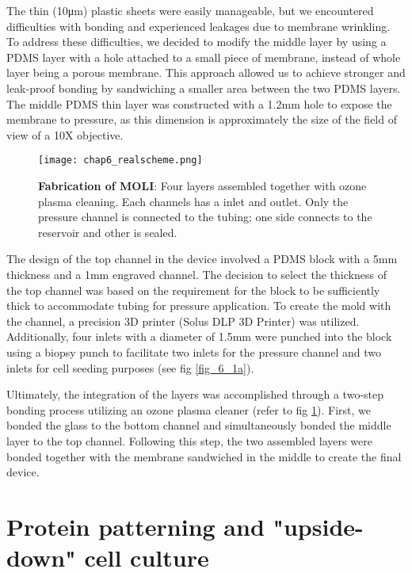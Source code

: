 The thin (10\unit{\um}) plastic sheets were easily manageable, but we encountered difficulties with bonding and experienced leakages due to membrane wrinkling. To address these difficulties, we decided to modify the middle layer by using a PDMS layer with a hole attached to a small piece of membrane, instead of whole layer being a porous membrane. This approach allowed us to achieve stronger and leak-proof bonding by sandwiching a smaller area between the two PDMS layers. The middle PDMS thin layer was constructed with a 1.2\unit{\mm} hole to expose the membrane to pressure, as this dimension is approximately the size of the field of view of a 10X objective.

\begin{figure}[b!]
	\centering
	\texttt{[image: chap6\_realscheme.png]}
	\caption{ \textbf{Fabrication of MOLI}: Four layers assembled together with ozone plasma cleaning. Each channels has a inlet and outlet. Only the pressure channel is connected to the tubing; one side connects to the reservoir and other is sealed. 
	}\label{fig_6_2}
\end{figure}

The design of the top channel in the device involved a PDMS block with a 5\unit{\mm} thickness and a 1mm engraved channel. The decision to select the thickness of the top channel was based on the requirement for the block to be sufficiently thick to accommodate tubing for pressure application.  To create the mold with the channel, a precision 3D printer (Solus DLP 3D Printer) was utilized. Additionally, four inlets with a diameter of 1.5\unit{\mm} were punched into the block using a biopsy punch to facilitate two inlets for the pressure channel and two inlets for cell seeding purposes  (see fig \ref{fig_6_1a}).

Ultimately, the integration of the layers was accomplished through a two-step bonding process utilizing an ozone plasma cleaner (refer to fig \ref{fig_6_2}). First, we bonded the glass to the bottom channel and simultaneously bonded the middle layer to the top channel. Following this step, the two assembled layers were bonded together with the membrane sandwiched in the middle to create the final device.
\vspace{-0.05cm}
\hypertarget{protein-patterning-and-inverted-cell-culture}{%
\section{Protein patterning and "upside-down" cell
culture}\label{protein-patterning-and-inverted-cell-culture}}

